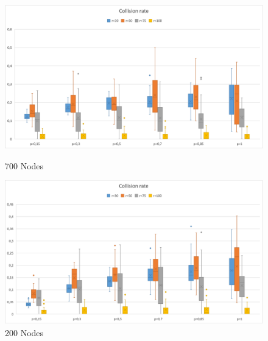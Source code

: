 \begin{figure}[H]
  \includegraphics[width=\linewidth]{./images/Collision700Boxplot.png}
  \caption{700 Nodes}\label{fig:awesome_image1}
\endminipage\hfill
{}
  \includegraphics[width=\linewidth]{./images/Collision200Boxplot.png}
  \caption{200 Nodes}\label{fig:awesome_image2}
\endminipage
\end{figure}